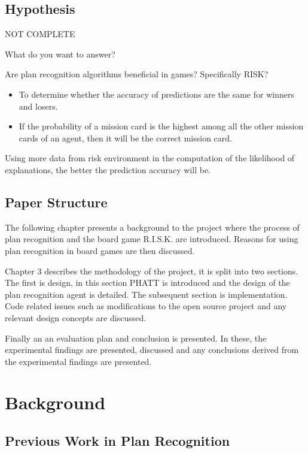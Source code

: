 \documentclass[parskip]{cs4rep}
\begin{document}
\section{Hypothesis}

NOT COMPLETE

What do you want to answer?

Are plan recognition algorithms beneficial in games? Specifically RISK?

\begin{itemize}
\item
To determine whether the accuracy of predictions are the same for winners and losers.
\item
If the probability of a mission card is the highest among all the other mission cards of an agent, then it will be the correct mission card.
\newline
\end{itemize}

Using more data from risk environment in the computation of the likelihood of explanations, the better the prediction accuracy will be.

\section{Paper Structure}

The following chapter presents a background to the project where the process of plan recognition and the board game R.I.S.K. are introduced. Reasons for using plan recognition in board games are then discussed.

Chapter 3 describes the methodology of the project, it is split into two sections. The first is design, in this section PHATT is introduced and the design of the plan recognition agent is detailed. The subsequent section is implementation. Code related issues such as modifications to the open source project and any relevant design concepts are discussed. 

Finally an an evaluation plan and conclusion is presented. In these, the experimental findings are presented, discussed and any conclusions derived from the experimental findings are presented.

\chapter{Background}

\section{Previous Work in Plan Recognition}
\end{document}
